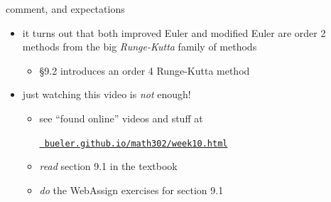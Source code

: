 \documentclass[urlcolor=blue,dvipsnames]{beamer}
\begin{document}
\begin{frame}{comment, and expectations}

\begin{itemize}
\item it turns out that both improved Euler and modified Euler are order 2 methods from the big \emph{Runge-Kutta} family of methods
     \begin{itemize}
     \item \S9.2 introduces an order 4 Runge-Kutta method
     \end{itemize}

\bigskip
\item just watching this video is \emph{not} enough!
     \begin{itemize}
     \item see ``found online'' videos and stuff at

     \centerline{\href{https://bueler.github.io/math302/week10.html}{\tt \color{cyan} bueler.github.io/math302/week10.html}}
     \item \emph{read} section 9.1 in the textbook
     \item \emph{do} the WebAssign exercises for section 9.1
     \end{itemize}
\end{itemize}
\end{frame}
\end{document}
